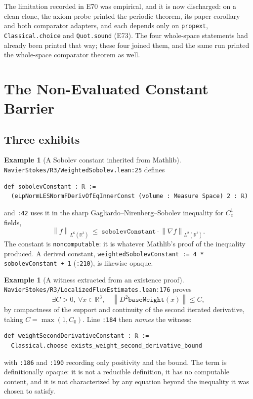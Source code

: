 \documentclass[11pt]{article}
\newcommand{\R}{\mathbb{R}}
\newcommand{\norm}[1]{\left\lVert #1\right\rVert}
\newcommand{\ct}[1]{\texttt{#1}}
\newcommand{\file}[1]{\texttt{\small #1}}
\theoremstyle{plain}
\theoremstyle{definition}
\newtheorem{example}[theorem]{Example}
\theoremstyle{remark}
\begin{document}
The limitation recorded in E70 was empirical, and it is now discharged: on a clean
clone, the axiom probe printed the periodic theorem, its paper corollary and both
comparator adapters, and each depends only on \ct{propext}, \ct{Classical.choice}
and \ct{Quot.sound} (E73). The four whole-space statements had already been
printed that way; these four joined them, and the same run printed the
whole-space comparator theorem as well.

\section{The Non-Evaluated Constant Barrier}
\label{sec:constants}

\subsection{Three exhibits}

\begin{example}[A Sobolev constant inherited from Mathlib]
\label{ex:sobolev}
\file{NavierStokes/R3/WeightedSobolev.lean:25} defines
\begin{lstlisting}
def sobolevConstant : ℝ :=
  (eLpNormLESNormFDerivOfEqInnerConst (volume : Measure Space) 2 : ℝ)
\end{lstlisting}
and \file{:42} uses it in the sharp Gagliardo--Nirenberg--Sobolev inequality for
$C^1_c$ fields,
\[
  \norm{f}_{L^6(\R^3)}\ \le\ \ct{sobolevConstant}\cdot
  \norm{\nabla f}_{L^2(\R^3)} .
\]
The constant is \ct{noncomputable}: it is whatever Mathlib's proof of the
inequality produced. A derived constant, \ct{weightedSobolevConstant :=
4 * sobolevConstant + 1} (\file{:210}), is likewise opaque.
\end{example}

\begin{example}[A witness extracted from an existence proof]
\label{ex:choose}
\file{NavierStokes/R3/LocalizedFluxEstimates.lean:176} proves
\[
  \exists C>0,\ \forall x\in\R^3,\quad
  \norm{D^2\ct{baseWeight}(x)}\le C,
\]
by compactness of the support and continuity of the second iterated derivative,
taking $C=\max(1,C_0)$. Line \file{:184} then \emph{names} the witness:
\begin{lstlisting}
def weightSecondDerivativeConstant : ℝ :=
  Classical.choose exists_weight_second_derivative_bound
\end{lstlisting}
with \file{:186} and \file{:190} recording only positivity and the bound. The
term is definitionally opaque: it is not a reducible definition, it has no
computable content, and it is not characterized by any equation beyond the
inequality it was chosen to satisfy.
\end{example}
\end{document}
